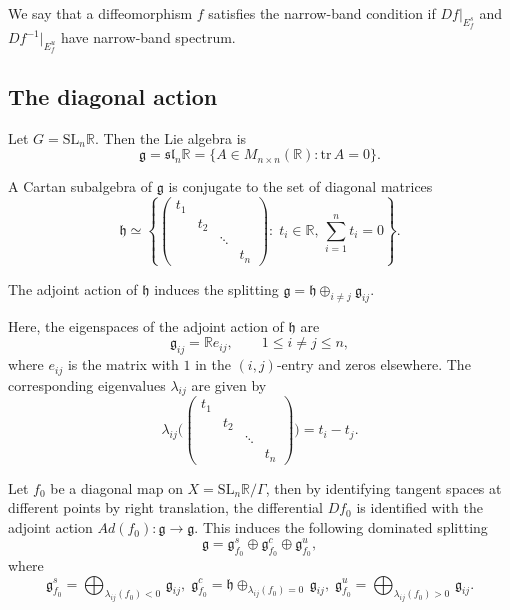 \documentclass[11pt]{amsart}
\numberwithin{equation}{section}
\newcommand{\R}{\mathbb{R}}
\theoremstyle{plain}
\begin{document}
We say that a diffeomorphism $f$ satisfies the narrow-band condition if
$Df|_{E^s_f}$ and $Df^{-1}|_{E^u_f}$ have narrow-band spectrum.


\subsection{The diagonal action}\label{sec:semisimple}


Let $G=\mathrm{SL}_n\R$. Then the Lie algebra is
\[
\mathfrak{g}=\mathfrak{sl}_n\R=\{A\in M_{n\times n}(\R): \mathrm{tr}\,A=0\}.
\]

A Cartan subalgebra of $\mathfrak{g}$ is conjugate to the set of diagonal matrices
\[
\mathfrak{h}\simeq \left\{
\begin{pmatrix}
 t_1 & &&\\
 & t_2&&\\
 && \ddots&\\
 &&& t_n
\end{pmatrix}:\; t_i\in \R, \,\sum_{i=1}^n t_i=0
\right\}.
\]

The adjoint action of $\mathfrak{h}$ induces the splitting $\mathfrak{g}=\mathfrak h\oplus_{i\neq j}\mathfrak{g}_{ij}$.

Here, the eigenspaces of the adjoint action of $\mathfrak{h}$ are
\[
\mathfrak{g}_{ij}=\R e_{ij},\qquad 1\le i\neq j\le n,
\]
where $e_{ij}$ is the matrix with $1$ in the $(i,j)$-entry and zeros elsewhere. The corresponding eigenvalues $\lambda_{ij}$ are given by
\[
\lambda_{ij}
\big(\begin{pmatrix}
 t_1 & &&\\
 & t_2&&\\
 && \ddots&\\
 &&& t_n
\end{pmatrix}\big)
=t_i-t_j.
\] 

Let $f_0$ be a diagonal map on $X=\mathrm{SL}_n\R/\Gamma$, then by identifying tangent spaces at different points by right translation, the differential $Df_0$ is identified with the adjoint action $Ad(f_0):\mathfrak{g}\to \mathfrak{g}$. This induces the following dominated splitting   \begin{equation}\label{eq:f_0split}
    \mathfrak g=\mathfrak g^s_{f_0}\oplus \mathfrak  g^c_{f_0}\oplus \mathfrak  g^u_{f_0},
\end{equation} where $$\mathfrak g^s_{f_0}=\bigoplus_{\lambda_{ij}(f_0)<0}\,\mathfrak{g}_{ij},\;  \mathfrak g^c_{f_0}=\mathfrak h\oplus_{\lambda_{ij}(f_0)=0}\,\mathfrak{g}_{ij},\;\mathfrak g^u_{f_0}=\bigoplus_{\lambda_{ij}(f_0)>0}\,\mathfrak{g}_{ij}.$$ 
\end{document}
